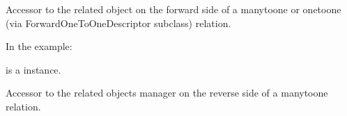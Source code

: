 \documentclass[letterpaper,10pt,english]{sphinxmanual}
\begin{document}
\begin{fulllineitems}
\begin{fulllineitems}
\end{fulllineitems}


\begin{fulllineitems}
\label{\detokenize{models/ticket:api.models.ticket.Ticket.issue}}
\pysigstartsignatures
{}
\pysigstopsignatures
\sphinxAtStartPar
Accessor to the related object on the forward side of a many\sphinxhyphen{}to\sphinxhyphen{}one or
one\sphinxhyphen{}to\sphinxhyphen{}one (via ForwardOneToOneDescriptor subclass) relation.

\sphinxAtStartPar
In the example:

\begin{sphinxVerbatim}[commandchars=\\\{\}]
 
       
\end{sphinxVerbatim}

\sphinxAtStartPar
{} is a  instance.

\end{fulllineitems}


\begin{fulllineitems}
\label{\detokenize{models/ticket:api.models.ticket.Ticket.issue_id}}
\pysigstartsignatures
{}
\pysigstopsignatures
\end{fulllineitems}


\begin{fulllineitems}
\label{\detokenize{models/ticket:api.models.ticket.Ticket.messages_set}}
\pysigstartsignatures
{}
\pysigstopsignatures
\sphinxAtStartPar
Accessor to the related objects manager on the reverse side of a
many\sphinxhyphen{}to\sphinxhyphen{}one relation.


\end{fulllineitems}
\end{fulllineitems}
\end{document}
